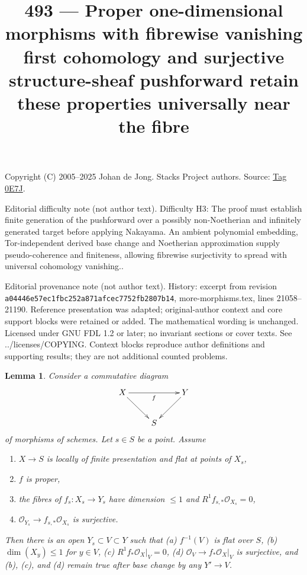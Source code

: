 \documentclass{amsart}
\theoremstyle{plain}
\newtheorem{lemma}[subsection]{Lemma}
\theoremstyle{definition}
\theoremstyle{remark}
\numberwithin{equation}{subsection}
\begin{document}
\title[Stacks Project, Tag 0E7J]{493 --- Proper one-dimensional morphisms with fibrewise vanishing first cohomology and surjective structure-sheaf pushforward retain these properties universally near the fibre}
\maketitle
\noindent Copyright (C) 2005--2025 Johan de Jong. Stacks Project authors. Source: \href{https://stacks.math.columbia.edu/tag/0E7J}{Tag 0E7J}.

\noindent Editorial difficulty note (not author text). Difficulty H3: The proof must establish finite generation of the pushforward over a possibly non-Noetherian and infinitely generated target before applying Nakayama. An ambient polynomial embedding, Tor-independent derived base change and Noetherian approximation supply pseudo-coherence and finiteness, allowing fibrewise surjectivity to spread with universal cohomology vanishing..

\noindent Editorial provenance note (not author text). History: excerpt from revision \texttt{a0444\allowbreak 6e57e\allowbreak c1fbc\allowbreak 252a8\allowbreak 71afc\allowbreak ec775\allowbreak 2fb28\allowbreak 07b14}, more-morphisms.tex, lines 21058--21190. Reference presentation was adapted; original-author context and core support blocks were retained or added. The mathematical wording is unchanged. Licensed under GNU FDL 1.2 or later; no invariant sections or cover texts. See ../licenses/COPYING. Context blocks reproduce author definitions and supporting results; they are not additional counted problems.

\begin{lemma}
\label{lemma-h1-fibre-zero-h0-kappa}
Consider a commutative diagram
$$
\xymatrix{
X \ar[rr]_f \ar[rd] & & Y \ar[ld] \\
& S
}
$$
of morphisms of schemes. Let $s \in S$ be a point. Assume
\begin{enumerate}
\item $X \to S$ is locally of finite presentation and flat at
points of $X_s$,
\item $f$ is proper,
\item the fibres of $f_s : X_s \to Y_s$ have dimension $\leq 1$
and $R^1f_{s, *}\mathcal{O}_{X_s} = 0$,
\item $\mathcal{O}_{Y_s} \to f_{s, *}\mathcal{O}_{X_s}$ is surjective.
\end{enumerate}
Then there is an open $Y_s \subset V \subset Y$ such that
(a) $f^{-1}(V)$ is flat over $S$,
(b) $\dim(X_y) \leq 1$ for $y \in V$,
(c) $R^1f_*\mathcal{O}_X|_V = 0$,
(d) $\mathcal{O}_V \to f_*\mathcal{O}_X|_V$
is surjective,
and (b), (c), and (d) remain true after base change by any $Y' \to V$.
\end{lemma}
\end{document}
